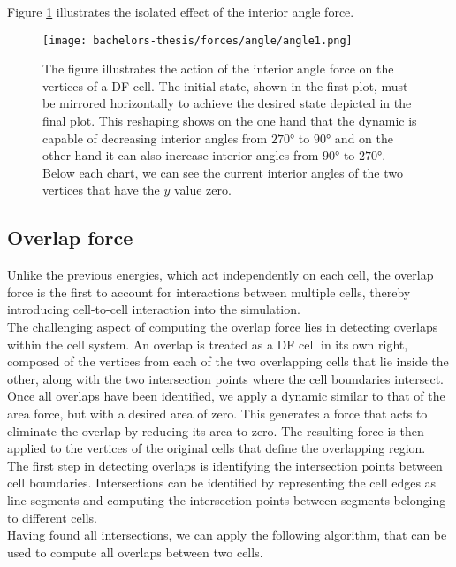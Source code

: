 Figure \ref{fig:angleForce} illustrates the isolated effect of the interior angle force.

\begin{figure}
	\begin{center}
		\texttt{[image: bachelors-thesis/forces/angle/angle1.png]}
		\caption{The figure illustrates the action of the interior angle force on the vertices of a DF cell.
		The initial state, shown in the first plot, must be mirrored horizontally to achieve the desired state depicted in the final plot.
		This reshaping shows on the one hand that the dynamic is capable of decreasing interior angles from $270$° to $90$° and on the other hand it can also increase interior angles from $90$° to $270$°. 
		Below each chart, we can see the current interior angles of the two vertices that have the $y$ value zero. 
		}
		\label{fig:angleForce}
	\end{center}
\end{figure}





 

\subsection{Overlap force}
Unlike the previous energies, which act independently on each cell, the overlap force is the first to account for interactions between multiple cells, thereby introducing cell-to-cell interaction into the simulation. \\
The challenging aspect of computing the overlap force lies in detecting overlaps within the cell system. 
An overlap is treated as a DF cell in its own right, composed of the vertices from each of the two overlapping cells that lie inside the other, along with the two intersection points where the cell boundaries intersect. \\ 
Once all overlaps have been identified, we apply a dynamic similar to that of the area force, but with a desired area of zero. 
This generates a force that acts to eliminate the overlap by reducing its area to zero. 
The resulting force is then applied to the vertices of the original cells that define the overlapping region. \\
The first step in detecting overlaps is identifying the intersection points between cell boundaries.
Intersections can be identified by representing the cell edges as line segments and computing the intersection points between segments belonging to different cells. \\
Having found all intersections, we can apply the following algorithm, that can be used to compute all overlaps between two cells. 


